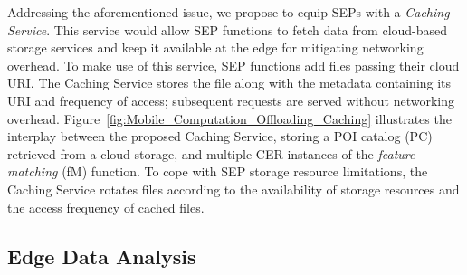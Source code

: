 Addressing the aforementioned issue, we propose to equip SEPs with a \textit{Caching Service}. This service would allow SEP functions to fetch data from cloud-based storage services and keep it available at the edge for mitigating networking overhead. 
To make use of this service, SEP functions add files passing their cloud URI.
The Caching Service stores the file along with the metadata containing its URI and frequency of access; subsequent requests are served without networking overhead. 
Figure~\ref{fig:Mobile_Computation_Offloading_Caching} illustrates the interplay between the proposed Caching Service, storing a POI catalog (PC) retrieved from a cloud storage, and multiple CER instances of the \textit{feature matching} (fM) function.
To cope with SEP storage resource limitations, the Caching Service rotates files according to the availability of storage resources and the access frequency of cached files. %


\subsection{Edge Data Analysis}

